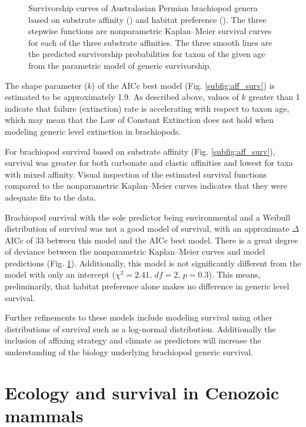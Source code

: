 \documentclass[12pt,letterpaper]{article}
\begin{document}
\begin{figure}[ht]
\begin{subfigure}[b]{0.5\textwidth}
      \label{subfig:env_surv}
    \end{subfigure}
    \caption{Survivorship curves of Australasian Permian brachiopod genera based on substrate affinity () and habitat preference (). The three stepwise functions are nonparametric Kaplan--Meier survival curves for each of the three substrate affinities. The three smooth lines are the predicted survivorship probabilities for taxon of the given age from the parametric model of generic survivorship.}%
  \label{fig:brach_surv}
\end{figure}

The shape parameter (\(k\)) of the AICc best model (Fig. \ref{subfig:aff_surv}) is estimated to be approximately 1.9. As described above, values of \(k\) greater than 1 indicate that failure (extinction) rate is accelerating with respect to taxon age, which may mean that the Law of Constant Extinction does not hold when modeling generic level extinction in brachiopods.

For brachiopod survival based on substrate affinity (Fig. \ref{subfig:aff_surv}), survival was greater for both carbonate and clastic affinities and lowest for taxa with mixed affinity. Visual inspection of the estimated survival functions compared to the nonparametric Kaplan--Meier curves indicates that they were adequate fits to the data. 

Brachiopod survival with the sole predictor being environmental and a Weibull distribution of survival was not a good model of survival, with an approximate \(\Delta\)AICc of 33 between this model and the AICc best model. There is a great degree of deviance between the nonparametric Kaplan--Meier curves and model predictions (Fig. \ref{subfig:env_surv}). Additionally, this model is not significantly different from the model with only an intercept (\(\chi^{2} = 2.41\), \(df = 2\), \(p = 0.3\)). This means, preliminarily, that habitat preference alone makes no difference in generic level survival.

Further refinements to these models include modeling survival using other distributions of survival such as a log-normal distribution. Additionally the inclusion of affixing strategy and climate as predictors will increase the understanding of the biology underlying brachiopod generic survival.


\section{Ecology and survival in Cenozoic mammals}
\end{document}
